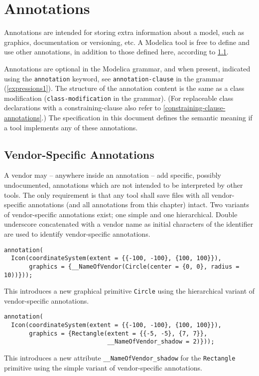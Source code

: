 \chapter{Annotations}\label{annotations}

Annotations are intended for storing extra information about a model, such as graphics, documentation or versioning, etc.
A Modelica tool is free to define and use other annotations, in addition to those defined here, according to \cref{vendor-specific-annotations}.

Annotations are optional in the Modelica grammar, and when present, indicated using the \lstinline!annotation! keyword, see \lstinline[language=grammar]!annotation-clause! in the grammar (\cref{expressions1}).
The structure of the annotation content is the same as a class modification (\lstinline[language=grammar]!class-modification! in the grammar).
(For replaceable class declarations with a constraining-clause also refer to \cref{constraining-clause-annotations}.)
The specification in this document defines the semantic meaning if a tool implements any of these annotations.

\section{Vendor-Specific Annotations}\label{vendor-specific-annotations}

A vendor may -- anywhere inside an annotation -- add specific, possibly undocumented, annotations which are not intended to be interpreted by other tools.
The only requirement is that any tool shall save files with all vendor-specific annotations (and all annotations from this chapter) intact.
Two variants of vendor-specific annotations exist; one simple and one hierarchical.
Double underscore concatenated with a vendor name as initial characters of the identifier are used to identify vendor-specific annotations.

\begin{example}
\begin{lstlisting}[language=modelica]
annotation(
  Icon(coordinateSystem(extent = {{-100, -100}, {100, 100}}),
       graphics = {__NameOfVendor(Circle(center = {0, 0}, radius = 10))}));
\end{lstlisting}
This introduces a new graphical primitive \lstinline!Circle! using the
hierarchical variant of vendor-specific annotations.
\begin{lstlisting}[language=modelica]
annotation(
  Icon(coordinateSystem(extent = {{-100, -100}, {100, 100}}),
       graphics = {Rectangle(extent = {{-5, -5}, {7, 7}},
                             __NameOfVendor_shadow = 2)}));
\end{lstlisting}
This introduces a new attribute \lstinline!__NameOfVendor_shadow!
for the \lstinline!Rectangle! primitive using the simple variant of
vendor-specific annotations.
\end{example}


